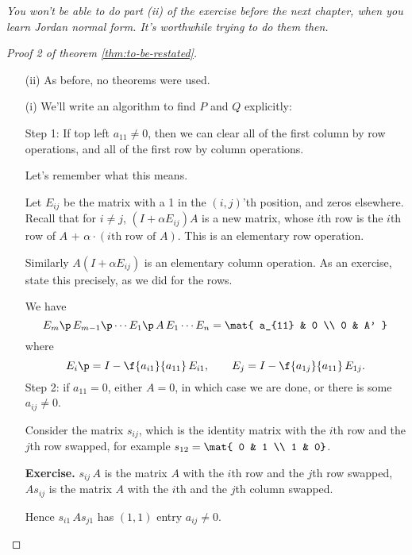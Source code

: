 \emph{You won't be able to do part (ii) of the exercise before the next chapter, when you learn Jordan normal form. It's worthwhile trying to do them then.}

\begin{proof}
	[Proof 2 of theorem \ref{thm:to-be-restated}] %
	\mbox{}
	\begin{enumerate}
		\shortskip
		\item [(ii)] As before, no theorems were used.
		\item [(i)] We'll write an algorithm to find $P$ and $Q$ explicitly:
		
		Step 1: If top left $a_{11}\neq 0$, then we can clear all of the first column by row operations, and all of the first row by column operations. %

		Let's remember what this means. 
		
Let $E_{ij}$ be the matrix with a 1 in the $(i,j)$'th position, and zeros elsewhere.
		Recall that for $i\neq j$, $\left( I+\alpha E_{ij} \right)A$ is a new matrix, whose $i$th row is the $i$th row of $A$ + $\alpha\cdot\left( i\text{th row of } A \right)$. This is an elementary row operation. %
		
		Similarly $A\left( I+\alpha E_{ij} \right)$ is an elementary column operation. As an exercise, state this precisely, as we did for the rows. %
		
			\pagebreak
		
		We have
		\begin{equation*}
			E_m\p \,E_{m-1}\p \cdots E_1\p \,A \,E_1 \cdots E_n
			=
			\mat{
				a_{11} & 0 \\
				0 & A'
			}
		\end{equation*}
		where
		\begin{equation*}
			E_i\p = I-\f{a_{i1}}{a_{11}} \, E_{i1}, \qquad
			E_j = I- \f{a_{1j}}{a_{11}} \, E_{1j}.
		\end{equation*}
		Step 2: if $a_{11}=0$, either $A=0$, in which case we are done, or there is some $a_{ij}\neq 0$.
		
		Consider the matrix $s_{ij}$, which is the identity matrix with the $i$th row and the $j$th row swapped, for example $s_{12} = \mat{ 0 & 1 \\ 1 &  0}$. %
		
		\textbf{Exercise.} $s_{ij}\,A$ is the matrix $A$ with the $i$th row and the $j$th row swapped, $A s_{ij}$ is the matrix $A$ with the $i$th  and the $j$th column swapped. %

		Hence $s_{i1} \, A s_{j1}$ has $(1,1)$ entry $a_{ij}\neq 0$.


\end{enumerate}
\end{proof}
